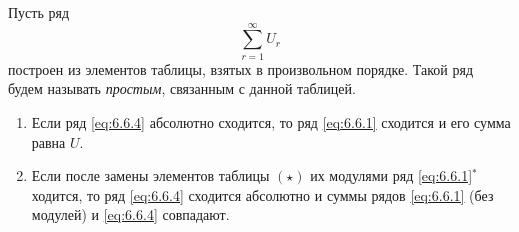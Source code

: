 \begin{definition}
    Пусть ряд
    \begin{equation}\label{eq:6.6.4}
        \sum_{r=1}^{\infty}U_r
    \end{equation}
    построен из элементов таблицы, взятых в произвольном порядке. Такой ряд будем называть \emph{простым}, связанным с данной таблицей.
\end{definition}

\begin{theorem}\leavevmode
    \begin{enumerate}
        \item Если ряд \ref{eq:6.6.4} абсолютно сходится, то ряд \ref{eq:6.6.1} сходится и его сумма равна $U$.

        \item Если после замены элементов таблицы $(\star)$ их модулями ряд \ref{eq:6.6.1}$ ^* $ ходится, то ряд \ref{eq:6.6.4} сходится абсолютно и суммы рядов \ref{eq:6.6.1} (без модулей) и \ref{eq:6.6.4} совпадают.
    \end{enumerate}
\end{theorem}

